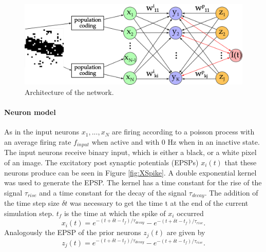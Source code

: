 \begin{figure}
  \label{fig:networkArchitecture}
  \includegraphics[width=\linewidth]{figures/networkPlan.png}
  \caption{Architecture of the network.}
\end{figure}

\paragraph{Neuron model}
As in \citet{nessler} the input neurons $x_1,...,x_N$ are firing according to a poisson process with an average firing rate $f_{input}$ when active and with 0 Hz when in an inactive state. The input neurons receive binary input, which is either a black, or a white pixel of an image. The excitatory post synaptic potentials (EPSPs) $x_i(t)$ that these neurons produce can be seen in Figure \ref{fig:XSpike}. A double exponential kernel was used to generate the EPSP. The kernel has a time constant for the rise of the signal $\tau_{rise}$  and a time constant for the decay of the signal $\tau_{decay}$. The addition of the time step size $\delta t$ was necessary to get the time t at the end of the current simulation step. $t_f$ is the time at which the spike of $x_i$ occurred
\begin{equation}
\label{eqn:EPSP}
x_i(t) = e^{-(t + \delta t - t_f) / \tau_{decay}} - e^{-(t + \delta t - t_f) / \tau_{rise}}.
\end{equation}
Analogously the EPSP of the prior neurons $z_j(t)$ are given by
\begin{equation}
\label{eqn:EPSPPrior}
z_j(t) = e^{-(t + \delta t - t_f) / \tau_{decay}} - e^{-(t + \delta t - t_f) / \tau_{rise}}.
\end{equation}

